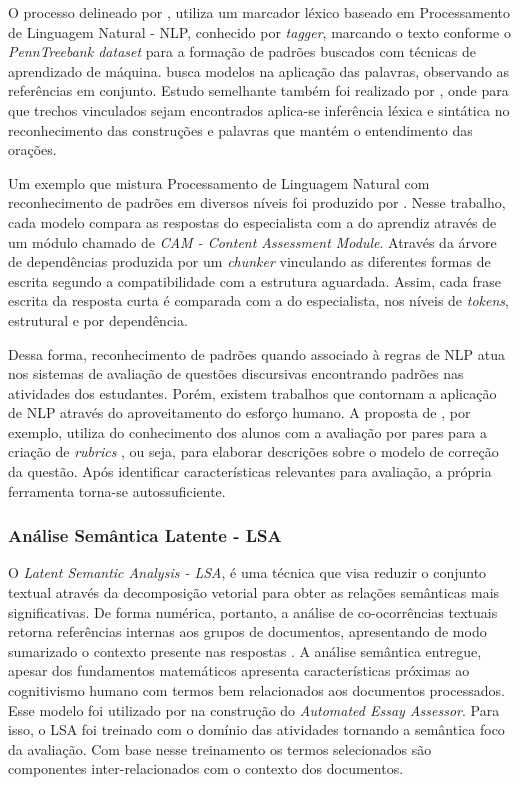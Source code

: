 O processo delineado por , utiliza um marcador léxico baseado em Processamento de Linguagem Natural - NLP, conhecido por \textit{tagger}, marcando o texto conforme o \textit{PennTreebank dataset} para a formação de padrões buscados com técnicas de aprendizado de máquina.  busca modelos na aplicação das palavras, observando as referências em conjunto. Estudo semelhante também foi realizado por , onde para que trechos vinculados sejam encontrados aplica-se inferência léxica e sintática no reconhecimento das construções e palavras que mantém o entendimento das orações.

Um exemplo que mistura Processamento de Linguagem Natural com reconhecimento de padrões em diversos níveis foi produzido por . Nesse trabalho, cada modelo compara as respostas do especialista com a do aprendiz através de um módulo chamado de \textit{CAM - Content Assessment Module}. Através da árvore de dependências produzida por um \textit{chunker} vinculando as diferentes formas de escrita segundo a compatibilidade com a estrutura aguardada. Assim, cada frase escrita da resposta curta é comparada com a do especialista, nos níveis de \textit{tokens}, estrutural e por dependência.

Dessa forma, reconhecimento de padrões quando associado à regras de NLP atua nos sistemas de avaliação de questões discursivas encontrando padrões nas atividades dos estudantes. Porém, existem trabalhos que contornam a aplicação de NLP através do aproveitamento do esforço humano. A proposta de , por exemplo, utiliza do conhecimento dos alunos com a avaliação por pares para a criação de \textit{rubrics} \cite{arter2006}, ou seja, para elaborar descrições sobre o modelo de correção da questão. Após identificar características relevantes para avaliação, a própria ferramenta torna-se autossuficiente.

\subsubsection{Análise Semântica Latente - LSA} \label{ss:LSA}
O \textit{Latent Semantic Analysis - LSA}, \cite{deerwester1990} é uma técnica que visa reduzir o conjunto textual através da decomposição vetorial para obter as relações semânticas mais significativas. De forma numérica, portanto, a análise de co-ocorrências textuais retorna referências internas aos grupos de documentos, apresentando de modo sumarizado o contexto presente nas respostas \cite{landauer1998}. A análise semântica entregue, apesar dos fundamentos matemáticos apresenta características próximas ao cognitivismo humano com termos bem relacionados aos documentos processados. Esse modelo foi utilizado por  na construção do \textit{Automated Essay Assessor}. Para isso, o LSA foi treinado com o domínio das atividades tornando a semântica foco da avaliação. Com base nesse treinamento os termos selecionados são componentes inter-relacionados com o contexto dos documentos.

